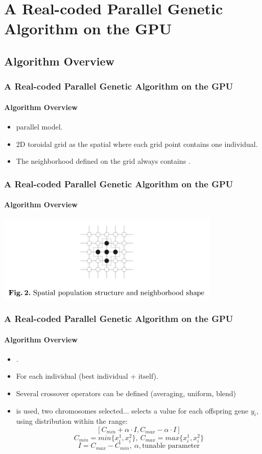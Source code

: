 \section{A Real-coded Parallel Genetic Algorithm on the GPU}
\subsection{Algorithm Overview}
\frame
{
\frametitle{A Real-coded Parallel Genetic Algorithm on the GPU}
\framesubtitle{Algorithm Overview}
\begin{itemize}
	\item {} parallel model.
	\item 2D toroidal grid as the spatial  where each grid point contains one individual.
	\item The neighborhood defined on the grid always contains .
\end{itemize}
}

\frame
{
\frametitle{A Real-coded Parallel Genetic Algorithm on the GPU}
\framesubtitle{Algorithm Overview}
\begin{center}
	\includegraphics[width=0.8\textwidth]{img/vecinos}
\end{center}
}

\frame
{
\frametitle{A Real-coded Parallel Genetic Algorithm on the GPU}
\framesubtitle{Algorithm Overview}
\begin{itemize}
	\item {}.
	\item For each individual (best individual + itself).
	\item Several crossover operators can be defined (averaging, uniform, blend)
	\item {} is used, two chromosomes selected... selects a value for each offspring gene $y_i$, using distribution within the range:
	$$\left[C_{min} + \alpha \cdot I, C_{max} - \alpha \cdot I\right]$$ 
	$$ C_{min} = min\{x_{i}^{1}, x_{i}^{2}\},\ C_{max} = max\{x_{i}^{1}, x_{i}^{2}\}$$
	$$ I = C_{max} - C_{min},\ \alpha, \text{tunable parameter} $$
\end{itemize}
}

